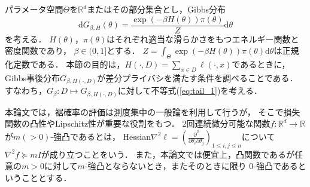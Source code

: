 \documentclass{jarticle}
\newcommand{\dd}{\mathrm{d}}
\theoremstyle{definition}
\begin{document}
パラメータ空間$\Theta$を$\mathbb{R}^d$またはその部分集合とし，Gibbs分布
\begin{equation}
\dd G_{\beta, H}(\theta) = \frac{\exp(-\beta H(\theta))\pi(\theta)}{Z} \dd \theta
\end{equation}
を考える．
$H(\theta)$，$\pi(\theta)$はそれぞれ適当な滑らかさをもつエネルギー関数と密度関数であり，
$\beta \in (0, 1]$とする．
$Z=\int_{\Theta} \exp(-\beta H(\theta))\pi(\theta)\dd \theta$は正規化定数である．
本節の目的は，$H(\cdot, D) = \sum_{x \in D} \ell(\cdot, x)$であるときに，
Gibbs事後分布$G_{\beta, H(\cdot, D)}$が差分プライバシを満たす条件を調べることである．
すなわち，$G_\beta: D \mapsto G_{\beta, H(\cdot, D)}$に対して不等式(\ref{eq:tail_1})を考える．

本論文では，裾確率の評価は測度集中の一般論を利用して行うが，
そこで損失関数の凸性やLipschitz性が重要な役割をもつ．
$2$回連続微分可能な関数$f: \mathbb{R}^d \to \mathbb{R}$が$m(> 0)$-強凸であるとは，
Hessian$\nabla^2 \ell = (\frac{\partial^2}{\partial \theta_i \partial\theta_j})_{1 \leq i,j \leq n}$について
$\nabla^2 f \succeq m I$が成り立つことをいう．
また，本論文では便宜上，凸関数であるが任意の$m>0$に対して$m$-強凸とならないとき，またそのときに限り
$0$-強凸であるということとする．
\end{document}
